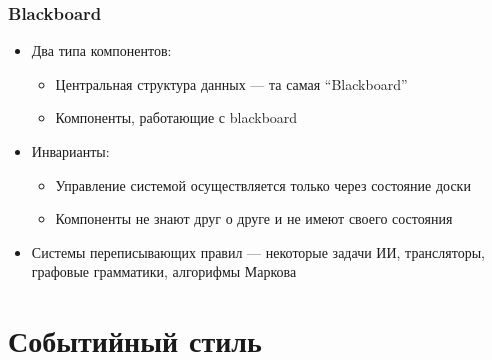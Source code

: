 \documentclass{../../slides-style}
\begin{document}
    \begin{frame}
        \frametitle{Blackboard}
        \begin{itemize}
            \item Два типа компонентов:
            \begin{itemize}
                \item Центральная структура данных --- та самая ``Blackboard''
                \item Компоненты, работающие с blackboard
            \end{itemize}
            \item Инварианты:
            \begin{itemize}
                \item Управление системой осуществляется только через состояние доски
                \item Компоненты не знают друг о друге и не имеют своего состояния
            \end{itemize}
            \item Системы переписывающих правил --- некоторые задачи ИИ, трансляторы, графовые грамматики, алгорифмы Маркова
        \end{itemize}
    \end{frame}

    \section{Событийный стиль}
\end{document}
